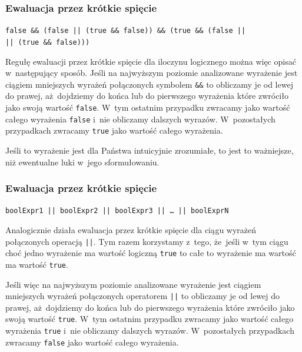 \documentclass[10pt,t]{beamer}
\begin{document}
\begin{frame}
  \frametitle{Ewaluacja przez krótkie spięcie}


  \texttt{false \&\& (false || (true \&\& false)) \&\& (true \&\&
    (false || \\ }
  \hphantom{aaaa}\texttt{|| (true \&\& false)))}



  Regułę ewaluacji przez krótkie spięcie dla iloczynu logicznego można więc
  opisać w~następujący sposób. Jeśli na najwyższym poziomie analizowane
  wyrażenie jest ciągiem mniejszych wyrażeń połączonych symbolem
  \texttt{\&\&} to obliczamy je od lewej do prawej, aż~dojdziemy do końca
  lub do pierwszego wyrażenia które zwróciło jako swoją wartość
  \texttt{false}. W~tym ostatnim przypadku zwracamy jako wartość całego
  wyrażenia \texttt{false} i~nie obliczamy dalszych wyrazów. W~pozostałych
  przypadkach zwracamy \texttt{true} jako wartość całego wyrażenia.

  Jeśli to wyrażenie jest dla Państwa intuicyjnie zrozumiałe, to jest to
  ważniejsze, niż ewentualne luki w~jego sformułowaniu.

\end{frame}





\begin{frame}
  \frametitle{Ewaluacja przez krótkie spięcie}


  \texttt{boolExpr1 || boolExpr2 || boolExpr3 || \ldots{} || boolExprN}

  Analogicznie działa ewaluacja przez krótkie spięcie dla ciągu wyrażeń
  połączonych operacją \texttt{||}. Tym razem korzystamy z~tego, że~jeśli
  w~tym ciągu choć jedno wyrażenie ma wartość logiczną \texttt{true} to całe
  to wyrażenie ma wartość ma wartość \texttt{true}.

  Jeśli więc na najwyższym poziomie analizowane wyrażenie jest ciągiem
  mniejszych wyrażeń połączonych operatorem \texttt{||} to obliczamy je od
  lewej do prawej, aż~dojdziemy do końca lub do pierwszego wyrażenia które
  zwróciło jako swoją wartość \texttt{true}. W~tym ostatnim przypadku
  zwracamy jako wartość całego wyrażenia \texttt{true} i~nie obliczamy
  dalszych wyrazów. W~pozostałych przypadkach zwracamy \texttt{false} jako
  wartość całego wyrażenia.

\end{frame}
\end{document}

